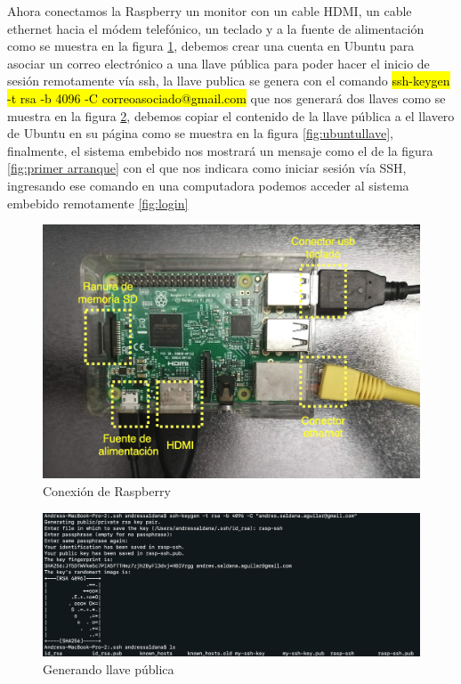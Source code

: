 Ahora conectamos la Raspberry un monitor con un cable HDMI, un cable ethernet hacia el módem telefónico, un teclado y a la fuente de alimentación como se muestra en la figura \ref{fig:conexion}, debemos crear una cuenta en Ubuntu para asociar un correo electrónico a una llave pública para poder hacer el inicio de sesión remotamente vía ssh, la llave publica se genera con el comando \hl{ssh-keygen -t rsa -b 4096 -C correoasociado@gmail.com} que nos generará dos llaves como se muestra en la figura \ref{fig:llave}, debemos copiar el contenido de la llave pública a el llavero de Ubuntu en su página como se muestra en la figura \ref{fig:ubuntullave}, finalmente, el sistema embebido nos mostrará un mensaje como el de la figura \ref{fig:primer arranque} con el que nos indicara como iniciar sesión vía SSH, ingresando ese comando en una computadora podemos acceder al sistema embebido remotamente \ref{fig:login} 

\begin{figure}[H]
	\centering
	\includegraphics[scale=.25]{Capitulo5/images/rasp.png}
	\caption{Conexión de Raspberry}
	\label{fig:conexion}
\end{figure} 

\begin{figure}[H]
	\centering
	\includegraphics[scale=.3]{Capitulo5/images/ssh_keygen.png}
	\caption{Generando llave pública}
	\label{fig:llave}
\end{figure} 

